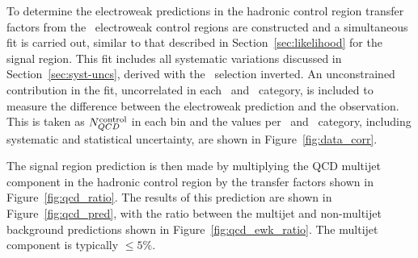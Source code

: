 To determine the electroweak predictions in the hadronic control region transfer factors 
from the \mhtmet~electroweak control regions are constructed and a simultaneous
fit is carried out, similar to that described in Section~\ref{sec:likelihood} for the signal region. 
This fit includes all systematic variations discussed in Section~\ref{sec:syst-uncs}, 
derived with the \mhtmet~selection inverted. An unconstrained contribution in the fit, 
uncorrelated in each \njet~and \scalht~category, is included to measure the difference between 
the electroweak prediction and the observation. This is taken as $N_{QCD}^{\rm control}$ in each bin and
the values per \njet~and \scalht~category, including systematic and statistical uncertainty,
are shown in Figure~\ref{fig:data_corr}. 

The signal region prediction is then made by multiplying the QCD multijet component in the hadronic 
control region by the transfer factors shown in Figure~\ref{fig:qcd_ratio}. The results of this prediction
are shown in Figure~\ref{fig:qcd_pred}, with the ratio between the multijet and non-multijet background
predictions shown in Figure~\ref{fig:qcd_ewk_ratio}. The multijet component is typically $\le 5\%$. 

